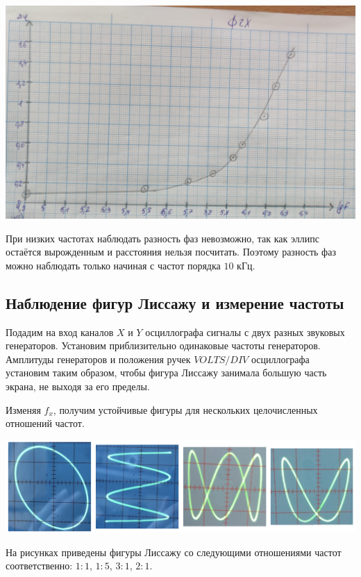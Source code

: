 \documentclass[a4paper, 12pt]{article} %
\begin{document}
\begin{center}
    \includegraphics[width=14cm]{13}
\end{center}

При низких частотах наблюдать разность фаз невозможно, так как эллипс остаётся вырожденным и расстояния нельзя посчитать. Поэтому разность фаз можно наблюдать только начиная с частот порядка $10$ кГц.


\subsection{Наблюдение фигур Лиссажу и измерение частоты}

Подадим на вход каналов $X$ и $Y$ осциллографа сигналы с двух разных звуковых генераторов. Установим приблизительно одинаковые частоты генераторов. Амплитуды генераторов и положения ручек $VOLTS/DIV$ осциллографа установим
таким образом, чтобы фигура Лиссажу занимала большую часть
экрана, не выходя за его пределы.

Изменяя $f_x$, получим устойчивые фигуры для нескольких целочисленных отношений частот.

\begin{center}
    \includegraphics[width=14cm]{11}
\end{center}

На рисунках приведены фигуры Лиссажу со следующими отношениями частот соответственно: $1 : 1$, $1 : 5$, $3 : 1$, $2 : 1$.
\end{document}
